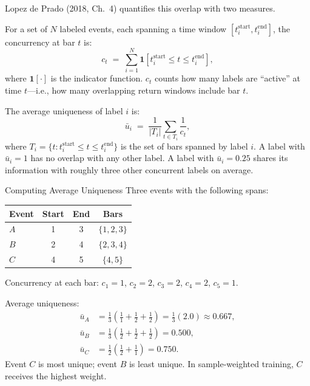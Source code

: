 Lopez de Prado (2018, Ch.~4) quantifies this overlap with two
measures.

\begin{definition}
For a set of $N$ labeled events, each spanning a time window
$[t_i^{\text{start}}, t_i^{\text{end}}]$, the concurrency at bar $t$ is:
\begin{equation}
\label{eq:concurrency}
c_t \;=\; \sum_{i=1}^{N} \mathbf{1}\!\left[t_i^{\text{start}} \leq t \leq t_i^{\text{end}}\right],
\end{equation}
where $\mathbf{1}[\cdot]$ is the indicator function.
$c_t$ counts how many labels are ``active'' at time $t$---i.e., how
many overlapping return windows include bar $t$.
\end{definition}

\begin{definition}
The average uniqueness of label $i$ is:
\begin{equation}
\label{eq:avg-uniqueness}
\bar{u}_i \;=\; \frac{1}{|T_i|}\sum_{t \in T_i} \frac{1}{c_t},
\end{equation}
where $T_i = \{t : t_i^{\text{start}} \leq t \leq t_i^{\text{end}}\}$
is the set of bars spanned by label $i$.
A label with $\bar{u}_i = 1$ has no overlap with any other label.
A label with $\bar{u}_i = 0.25$ shares its information with roughly
three other concurrent labels on average.
\end{definition}

\begin{workedexample}{Computing Average Uniqueness}
Three events with the following spans:
\begin{center}
\begin{tabular}{lccc}
\toprule
Event & Start & End & Bars \\
\midrule
$A$ & 1 & 3 & $\{1,2,3\}$ \\
$B$ & 2 & 4 & $\{2,3,4\}$ \\
$C$ & 4 & 5 & $\{4,5\}$ \\
\bottomrule
\end{tabular}
\end{center}

Concurrency at each bar:
$c_1 = 1$, $c_2 = 2$, $c_3 = 2$, $c_4 = 2$, $c_5 = 1$.

Average uniqueness:
\begin{align*}
\bar{u}_A &= \tfrac{1}{3}\left(\tfrac{1}{1} + \tfrac{1}{2} + \tfrac{1}{2}\right) = \tfrac{1}{3}(2.0) \approx 0.667, \\
\bar{u}_B &= \tfrac{1}{3}\left(\tfrac{1}{2} + \tfrac{1}{2} + \tfrac{1}{2}\right) = 0.500, \\
\bar{u}_C &= \tfrac{1}{2}\left(\tfrac{1}{2} + \tfrac{1}{1}\right) = 0.750.
\end{align*}
Event $C$ is most unique; event $B$ is least unique.
In sample-weighted training, $C$ receives the highest weight.
\end{workedexample}

